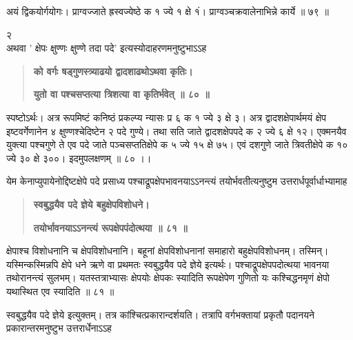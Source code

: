 \documentclass[11pt, openany]{book}
\begin{document}
\begin{sloppypar}
\hangindent=0.2in अयं द्विकयोर्गयोगः। प्राग्वज्जाते ह्रस्वज्येष्ठे क १ ज्ये १ क्षे १ं। प्राग्वञ्चक्रवालेनाभिन्ने कार्ये ॥ ७९ ॥

\hspace{2.7in}२\\

\hangindent=0.2in \hspace{0.2in}अथवा ' क्षेपः क्षुण्णः क्षुण्णे तदा पदे' इत्यस्योदाहरणमनुष्टुभाऽऽह\textendash

\begin{quote}
\hspace{0.5in}\textbf{को वर्गः षड्गुणस्त्र्याढयो द्वादशाढथोऽथवा कृतिः।}

\hspace{0.5in}\textbf{युतो वा पश्चसप्तत्या त्रिशत्या वा कृतिर्भवेत् ॥ ८० ॥}
\end{quote}

\hangindent=0.2in \hspace{0.2in}स्पष्टोऽर्थः। अत्र रूपमिष्टं कनिष्ठं प्रकल्प्य न्यासः प्र ६ क १ ज्ये ३ क्षे ३। अत्र द्वादशक्षेपार्थमयं क्षेप इष्टवर्गेणानेन ४ क्षुण्णश्चेदिष्टेन २ पदे गुण्ये। तथा सति जाते द्वादशक्षेपपदे क २ ज्ये ६ क्षे १२। एक्मनयैव युक्त्या पश्चगुणे ते एव पदे जाते पञ्चसप्ततिक्षेपे क ५ ज्ये १५ क्षे ७५। एवं दशगुणे जाते त्रिवतीक्षेपे क १० ज्ये ३० क्षे ३००। इदमुपलक्षणम् ॥ ८० ।।

\hangindent=0.2in \hspace{0.2in}येम केनाप्युपायेनोद्दिष्टक्षेपे पदे प्रसाध्य पश्चाद्रूपक्षेपभावनयाऽऽनन्त्यं तयोर्भवतीत्यनुष्टुम उत्तरार्धपूर्वार्धाभ्यामाह\textendash

\begin{quote}
\hspace{0.5in}\textbf{स्वबुद्धयैव पदे ज्ञेये बहुक्षेपविशोधने।}

\hspace{0.5in}\textbf{तयोर्भावनयाऽऽनन्त्यं रूपक्षेपपंदोत्थया ॥ ८१ ॥}
\end{quote}

\hangindent=0.2in \hspace{0.2in}क्षेपाश्च विशोधनानि च क्षेपविशोधनानि। बहूनां क्षेपविशोधनानां समाहारो बहुक्षेपविशोधनम्। तस्मिन्। यस्मिन्कस्मिन्नपि क्षेपे धने ऋणे वा प्रथमतः स्वबुद्धयैव पदे ज्ञेये इत्यर्थः। पश्चाद्रूपक्षेपपदोत्थया भावनया तथोरानन्त्यं सुलभम्। यतस्तत्राभ्यासः क्षेपयोः क्षेपकः स्यादिति रूपक्षेपेण गुणितो यः कश्चिद्धनमृणं क्षेपो यथास्थित एव स्यादिति ॥ ८१ ॥

\hangindent=0.2in \hspace{0.2in}स्वबुद्धयैव पदे ज्ञेये इत्युक्तम्। तत्र कांश्चित्प्रकारान्दर्शयति। तत्रापि वर्गभक्तायां प्रकृतौ पदानयने प्रकारान्तरमनुष्टुभ उत्तरार्धेनाऽऽह\textendash


\end{sloppypar}
\end{document}
